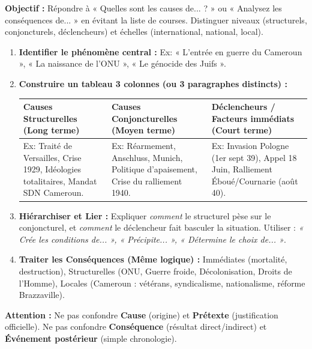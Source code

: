 \documentclass[11pt]{article}
\begin{document}
\begin{methode}
\textbf{Objectif :} Répondre à « Quelles sont les causes de... ? » ou « Analysez les conséquences de... » en évitant la liste de courses. Distinguer niveaux (structurels, conjoncturels, déclencheurs) et échelles (international, national, local).
\begin{enumerate}
    \item \textbf{Identifier le phénomène central :} Ex: « L'entrée en guerre du Cameroun », « La naissance de l'ONU », « Le génocide des Juifs ».
    \item \textbf{Construire un tableau 3 colonnes (ou 3 paragraphes distincts) :}
    \begin{center}
    \begin{tabularx}{\linewidth}{|X|X|X|}\hline
    \rowcolor{popblueL}
    \textbf{Causes Structurelles (Long terme)} & \textbf{Causes Conjoncturelles (Moyen terme)} & \textbf{Déclencheurs / Facteurs immédiats (Court terme)} \\ \hline
    Ex: Traité de Versailles, Crise 1929, Idéologies totalitaires, Mandat SDN Cameroun. & Ex: Réarmement, Anschluss, Munich, Politique d'apaisement, Crise du ralliement 1940. & Ex: Invasion Pologne (1er sept 39), Appel 18 Juin, Ralliement Éboué/Cournarie (août 40). \\ \hline
    \end{tabularx}
    \end{center}
    \item \textbf{Hiérarchiser et Lier :} Expliquer \textit{comment} le structurel pèse sur le conjoncturel, et \textit{comment} le déclencheur fait basculer la situation. Utiliser : \textit{« Crée les conditions de... », « Précipite... », « Détermine le choix de... »}.
    \item \textbf{Traiter les Conséquences (Même logique) :} Immédiates (mortalité, destruction), Structurelles (ONU, Guerre froide, Décolonisation, Droits de l'Homme), Locales (Cameroun : vétérans, syndicalisme, nationalisme, réforme Brazzaville).
\end{enumerate}
\textbf{Attention :} Ne pas confondre \textbf{Cause} (origine) et \textbf{Prétexte} (justification officielle). Ne pas confondre \textbf{Conséquence} (résultat direct/indirect) et \textbf{Événement postérieur} (simple chronologie).
\end{methode}
\end{document}
